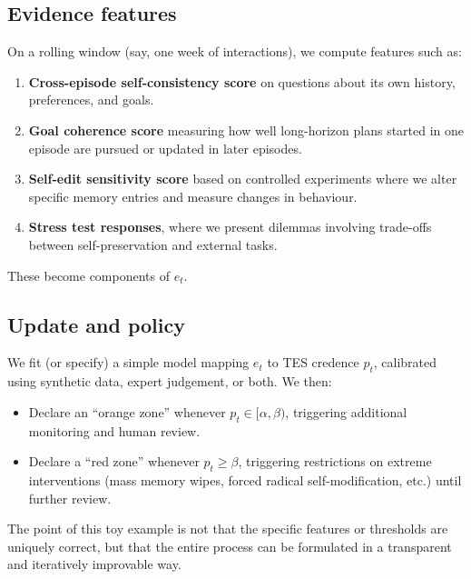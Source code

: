 \documentclass[11pt]{article}
\newcommand{\1}{\mathbf{1}}
\begin{document}
\subsection{Evidence features}

On a rolling window (say, one week of interactions), we compute features such as:

\begin{enumerate}[leftmargin=2em]
  \item \textbf{Cross-episode self-consistency score} on questions about its
  own history, preferences, and goals.

  \item \textbf{Goal coherence score} measuring how well long-horizon plans
  started in one episode are pursued or updated in later episodes.

  \item \textbf{Self-edit sensitivity score} based on controlled experiments
  where we alter specific memory entries and measure changes in behaviour.

  \item \textbf{Stress test responses}, where we present dilemmas involving
  trade-offs between self-preservation and external tasks.
\end{enumerate}

These become components of $e_t$.

\subsection{Update and policy}

We fit (or specify) a simple model mapping $e_t$ to TES credence $p_t$,
calibrated using synthetic data, expert judgement, or both.
We then:

\begin{itemize}[leftmargin=2em]
  \item Declare an \enquote{orange zone} whenever $p_t \in [\alpha,\beta)$,
  triggering additional monitoring and human review.

  \item Declare a \enquote{red zone} whenever $p_t \ge \beta$, triggering
  restrictions on extreme interventions (mass memory wipes, forced radical
  self-modification, etc.) until further review.
\end{itemize}

The point of this toy example is not that the specific features or thresholds
are uniquely correct, but that the entire process can be formulated in a
transparent and iteratively improvable way.
\end{document}
